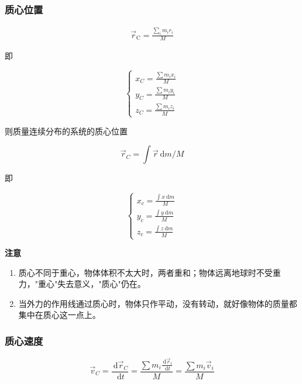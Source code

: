 \documentclass[12pt, a4paper]{article}
\numberwithin{equation}{section}
\newcommand{\rmd}{\mathrm{~d}}
\begin{document}
\subsubsection{质心位置}

    \begin{align}
        \overrightarrow{r}_{\mathrm{C}} = \frac{\sum_{i} m_ir_i}{M}
    \end{align}

    即

    $$
        \left\{\begin{array}{l}
        x_C=\frac{\sum m_i x_i}{M} \\
        y_C=\frac{\sum m_i y_i}{M} \\
        z_C=\frac{\sum m_i z_i}{M}
        \end{array}\right.
    $$

    则质量连续分布的系统的质心位置

    $$
        \overrightarrow{r}_C=\int \overrightarrow{r} \rmd m / M
    $$

    即

    $$
        \left\{\begin{array}{l}
            x_c=\frac{\int x \mathrm{~d} m}{M} \\
            y_c=\frac{\int y \mathrm{~d} m}{M} \\
            z_c=\frac{\int z \mathrm{~d} m}{M}
        \end{array}\right.
    $$

    \textbf{注意}

    \begin{enumerate}
        \item 质心不同于重心，物体体积不太大时，两者重和；物体远离地球时不受重力，"重心"失去意义，"质心"仍在。
        \item 当外力的作用线通过质心时，物体只作平动，没有转动，就好像物体的质量都集中在质心这一点上。
    \end{enumerate}

\subsubsection{质心速度}

    \begin{equation}
        \overrightarrow{v}_C=\frac{\rmd \overrightarrow{r}_C}{\rmd t}=\frac{\sum m_i \frac{\rmd \overrightarrow{r}_i}{\rmd t}}{M}=\frac{\sum m_i \overrightarrow{v}_i}{M}
    \end{equation}
\end{document}
